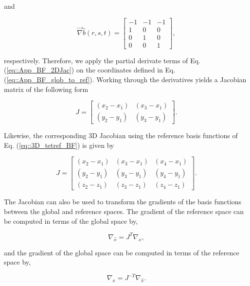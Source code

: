 \noindent and

\begin{equation}
\label{eq::App_BF_3D_tetref_grad}
\vec{\nabla} \hat{b} (r,s,t)  = 
\left[
\begin{array}{ccc}
-1 & -1 & -1 \\
1 & 0 & 0 \\
0 & 1 & 0 \\
0 & 0 & 1
\end{array}
\right] ,
\end{equation}

\noindent respectively. Therefore, we apply the partial derivate terms of Eq. (\ref{eq::App_BF_2DJac}) on the coordinates defined in Eq. (\ref{eq::App_BF_glob_to_ref}). Working through the derivatives yields a Jacobian matrix of the following form

\begin{equation}
\label{eq::App_BF_2DJac_MOD}
J = \left[
\begin{array}{cc}
(x_2 - x_1) & (x_3 - x_1) \\
(y_2 - y_1) & (y_3 - y_1)
\end{array}
\right].
\end{equation}

\noindent Likewise, the corresponding 3D Jacobian using the reference basis functions of Eq. (\ref{eq::3D_tetref_BF}) is given by 

\begin{equation}
\label{eq::App_BF_2DJac_MOD}
J = \left[
\begin{array}{ccc}
(x_2 - x_1) & (x_3 - x_1)& (x_4 - x_1) \\
(y_2 - y_1) & (y_3 - y_1)& (y_4 - y_1) \\
(z_2 - z_1) & (z_3 - z_1)& (z_4 - z_1)
\end{array}
\right].
\end{equation}

\noindent The Jacobian can also be used to transform the gradients of the basis functions between the global and reference spaces. The gradient of the reference space can be computed in terms of the global space by,

\begin{equation}
\label{eq::App_BF_grad_ref}
\nabla_{\hat{x}} = J^{T} \nabla_{x}  ,
\end{equation}

\noindent and the gradient of the global space can be computed in terms of the reference space by,

\begin{equation}
\label{eq::App_BF_grad_glob}
\nabla_{x} = J^{-T} \nabla_{\hat{x}}  .
\end{equation}

